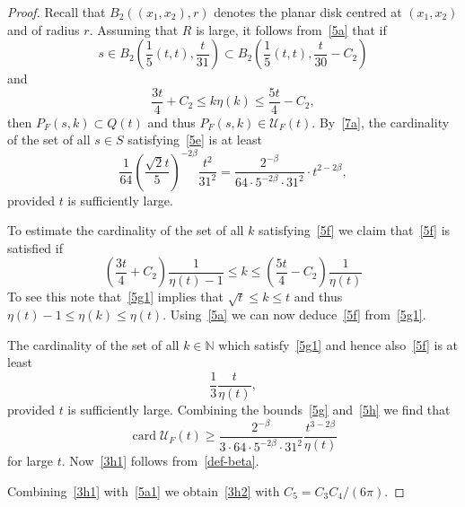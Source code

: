 \documentclass[12pt,a4paper]{amsart}
\theoremstyle{plain}
\theoremstyle{definition}
\theoremstyle{remark}
\def\N{\mathbb N}
\def\cU{\mathcal U}
\def\card{\operatorname{card}}
\numberwithin{equation}{section}
\begin{document}
\begin{proof}
Recall that  $B_2((x_1,x_2),r)$ denotes
the planar disk centred at $(x_1,x_2)$ and of radius $r$. Assuming that $R$ is large, it follows from~\eqref{5a} that 
if 
\begin{equation}\label{5e}
s
\in
 B_2\!\left( \frac15(t, t),\frac{t}{31}\right)
\subset
 B_2\!\left( \frac15(t, t),\frac{t}{30}-C_2\right)
\end{equation}
and 
\begin{equation}\label{5f}
\frac{3t}{4}+C_2\leq k\eta(k) \leq \frac{5t}{4}-C_2 ,
\end{equation}
then $P_F(s,k)\subset Q(t)$ and thus $P_F(s,k)\in \cU_F(t)$.
By~\eqref{7a}, 
the cardinality of the set of all $s\in S$ satisfying~\eqref{5e} 
is at least 
\begin{equation}\label{5g}
\frac{1}{64} \left(\frac{\sqrt{2}t}{5}\right)^{-2\beta} \frac{t^2}{31^2}
=\frac{2^{-\beta} }{64\cdot 5^{-2\beta} \cdot 31^2} \cdot t^{2-2\beta},
\end{equation}
provided $t$ is sufficiently large.

To estimate the cardinality of the set of all $k$ satisfying~\eqref{5f} we 
claim that~\eqref{5f} is satisfied if 
\begin{equation}\label{5g1}
\left(\frac{3t}{4}+C_2\right)\frac{1}{\eta(t)-1}
\leq k\leq
\left(\frac{5t}{4}-C_2\right)\frac{1}{\eta(t)}
\end{equation}
To see this note that~\eqref{5g1} implies that 
$\sqrt{t}\leq k\leq t$ and thus $\eta(t)-1\leq\eta(k)\leq \eta(t)$.
Using~\eqref{5a} we can now deduce~\eqref{5f} from~\eqref{5g1}.

The cardinality of the 
set of all $k\in\N$ which satisfy~\eqref{5g1} and hence also~\eqref{5f} is at least
\begin{equation}\label{5h}
\frac13 \frac{t}{\eta(t)},
\end{equation}
provided $t$ is sufficiently large.
Combining the bounds~\eqref{5g} and~\eqref{5h} we find that 
\begin{equation}\label{5i}
\card \cU_F(t)
\geq \frac{2^{-\beta} }{3\cdot 64\cdot 5^{-2\beta} \cdot 31^2} \frac{t^{3-2\beta}}{\eta(t)}
\end{equation}
for large $t$. 
Now~\eqref{3h1} follows from~\eqref{def-beta}.

Combining~\eqref{3h1} with~\eqref{5a1} we obtain~\eqref{3h2} with $C_5=C_3C_4/(6\pi)$.


\end{proof}
\end{document}
